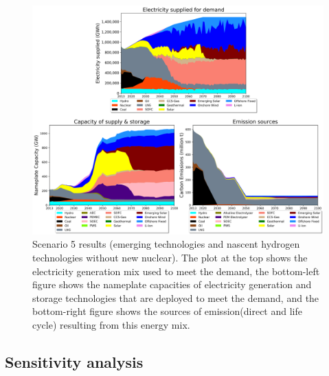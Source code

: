 \begin{figure}[H] 
\centering
\includegraphics[scale=0.5]{figures/lowtrltech_nonuc}
\caption{Scenario 5 results (emerging technologies and nascent hydrogen technologies without new nuclear). The plot at the top shows the electricity generation mix used to meet the demand, the bottom-left figure shows the nameplate capacities of electricity generation and storage technologies that are deployed to meet the demand, and the bottom-right figure shows the sources of emission(direct and life cycle) resulting from this energy mix.}
\label{scen5}
\end{figure}

\subsection{Sensitivity analysis}

